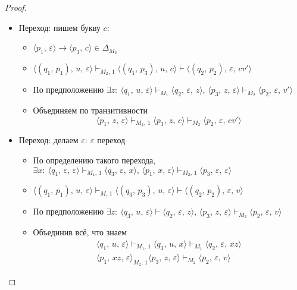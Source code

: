\documentclass[a4paper,12pt]{article}
\theoremstyle{plain}
\theoremstyle{definition}
\theoremstyle{remark}
\begin{document}
\begin{proof}
\begin{itemize}
		\item Переход: пишем букву $c$:
		      \begin{itemize}
			      \item $\langle p_1,\,\varepsilon\rangle \to \langle p_3,\,c\rangle \in \Delta_{M_2}$
			      \item $\langle(q_1,\,p_1),\,u,\,\varepsilon\rangle\vdash_{M_2,\,1}\langle(q_1,\,p_3),\,u,\,c\rangle\vdash\langle(q_2,\,p_2),\,\varepsilon,\,cv'\rangle$
			      \item По предположению $\exists z :\: \langle q_1,\,u,\,\varepsilon\rangle\vdash_{M_1}\langle q_2,\,\varepsilon,\,z\rangle,\,\langle p_3,\,z,\,\varepsilon\rangle\vdash_{M_2}\langle p_2,\,\varepsilon,\,v'\rangle$
			      \item Объединяем по транзитивности
			            \[
				            \langle p_1,\,z,\,\varepsilon\rangle\vdash_{M_2,\,1}\langle p_3,\,z,\,c\rangle\vdash_{M_2}\langle p_2,\,\varepsilon,\,cv'\rangle
			            \]
		      \end{itemize}
		\item Переход: делаем $\varepsilon:\:\varepsilon$ переход
		      \begin{itemize}
			      \item По определению такого перехода, $\exists x :\: \langle q_1,\,\varepsilon,\,\varepsilon\rangle\vdash_{M_1,\,1}\langle q_3,\,\varepsilon,\,x\rangle,\, \langle p_1,\,x,\,\varepsilon\rangle\vdash_{M_2,\,1}\langle p_3,\,\varepsilon,\,\varepsilon\rangle$
			      \item $\langle(q_1,\,p_1),\,u,\,\varepsilon\rangle\vdash_{M,\,1}\langle(q_3,\,p_3),\,u,\,\varepsilon\rangle\vdash\langle(q_2,\,p_2),\,\varepsilon,\,v\rangle$
			      \item По предположению $\exists z :\: \langle q_3,\,u,\,\varepsilon\rangle\vdash\langle q_2,\,\varepsilon,\,z\rangle,\, \langle p_3,\,z,\,\varepsilon\rangle\vdash_{M_2}\langle p_2,\,\varepsilon,\,v\rangle$
			      \item Объединив всё, что знаем
						\begin{align*}
							\langle q_1,\,u,\,\varepsilon\rangle\vdash_{M_1,\,1}\langle q_3,\,u,\,x\rangle\vdash_{M_1}\langle q_2,\,\varepsilon,\,xz\rangle\\
							\langle p_1,\,xz,\,\varepsilon\rangle_{M_2,\,1}\langle p_3,\,z,\,\varepsilon\rangle\vdash_{M_2}\langle p_2,\,\varepsilon,\,v\rangle
						\end{align*}
					\end{itemize}
	\end{itemize}

\end{proof}
\end{document}
